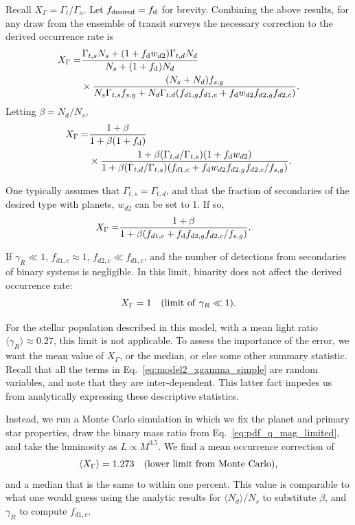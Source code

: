 \documentclass{emulateapj}
\begin{document}
Recall $X_\Gamma = \Gamma_t / \Gamma_a$. Let $f_{\rm desired} = f_{\rm d}$ for 
brevity.
Combining the above results, for any draw from the ensemble of transit 
surveys the necessary correction to the derived occurrence rate is
\begin{align}
X_\Gamma =
&\frac{\Gamma_{t,s}N_s + (1+f_{\rm d}w_{d2})\Gamma_{t,d}N_d }{N_s + (1+f_{\rm 
d})N_d}
\nonumber \\
&\times
\frac{(N_s + N_d)f_{s,g}}{N_s \Gamma_{t,s} f_{s,g} + N_d \Gamma_{t,d}
      (f_{d1,g}f_{d1,c} + f_{\rm d}w_{d2}f_{d2,g}f_{d2,c})  }.
\end{align}
Letting $\beta = N_d/N_s$, 
\begin{align}
X_\Gamma =
&\frac{1+\beta}{1 + \beta(1+f_{\rm d})} 
\nonumber \\
&\times
\frac{ 1+ \beta (\Gamma_{t,d}/\Gamma_{t,s}) (1+f_{\rm d}w_{d2}) }
{1 +\beta(\Gamma_{t,d}/\Gamma_{t,s})(f_{d1,c} + f_{\rm 
d}w_{d2}f_{d2,g}f_{d2,c}/f_{s,g})}.
\end{align}

One typically assumes that $\Gamma_{t,s}=\Gamma_{t,d}$, and that the 
fraction of secondaries of the desired type with planets, $w_{d2}$ can be set 
to 1.
If so,
\begin{align}
X_\Gamma =
&\frac{1+\beta}
{1 +\beta(f_{d1,c} + f_{\rm d}f_{d2,g}f_{d2,c}/f_{s,g})}.
\label{eq:model2_xgamma_simple}
\end{align}

If $\gamma_R \ll 1$, $f_{d1,c}\approx 1$, $f_{d2,c}\ll f_{d1,c}$, and the 
number of detections from secondaries of binary systems is negligible.
In this limit, binarity does not affect the derived occurrence rate:
\begin{equation}
X_\Gamma = 1 \quad ({\rm limit\ of}\ \gamma_R \ll 1).
\end{equation}

For the stellar population described in this model, with a mean light ratio 
$\langle \gamma_R \rangle \approx 0.27$, this limit is not applicable.
To assess the importance of the error, we want the mean
value of $X_\Gamma$, or the median, or else some other summary statistic.
Recall that all the terms in Eq.~\ref{eq:model2_xgamma_simple} are
random variables, and note that they are inter-dependent.
This latter fact impedes us from analytically expressing these 
descriptive statistics.

Instead, we run a Monte Carlo simulation in which we fix the planet and 
primary star properties, draw the binary mass ratio from 
Eq.~\ref{eq:pdf_q_mag_limited}, 
and take the luminosity as $L\propto M^{3.5}$. We find a mean occurrence 
correction of 
\begin{equation}
\langle X_\Gamma \rangle =1.273\quad ({\rm lower\ limit\ from\ Monte\ Carlo}),
\label{eq:X_Gamma_model2_lower}
\end{equation}
and a median that is the same to within one percent.
This value is comparable to what one would guess using the analytic results 
for $\langle N_d \rangle / N_s$ to substitute $\beta$, and $\gamma_R$ to 
compute $f_{d1,c}$.
\end{document}
